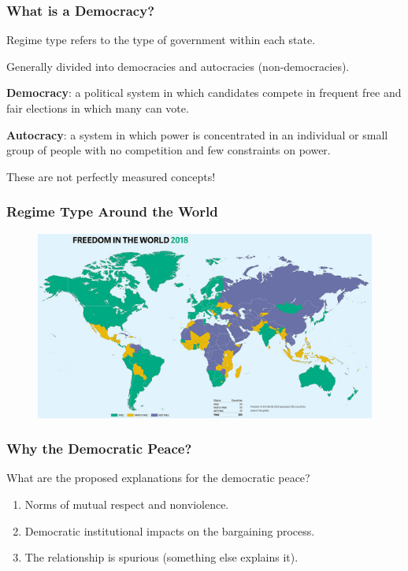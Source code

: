 \documentclass{beamer}
\begin{document}
\begin{frame} 
\frametitle{\LARGE{What is a Democracy?}}
\begin{itemize}
	\large{
		\item Regime type refers to the type of government within each state. \pause 
		\item Generally divided into democracies and autocracies (non-democracies). \pause 
		\item \textbf{Democracy}: a political system in which candidates compete in frequent free and fair elections in which many can vote. \pause 
		\item \textbf{Autocracy}: a system in which power is concentrated in an individual or small group of people with no competition and few constraints on power. \pause 
		\item These are not perfectly measured concepts!
	}
\end{itemize}
\end{frame}

\begin{frame} 
\frametitle{\LARGE{Regime Type Around the World}}
\begin{figure}[ht!]
	\centering
	\includegraphics[width=\textwidth,height=0.8\textheight,keepaspectratio]{./democ.jpg}
\end{figure}
\end{frame}

\begin{frame} 
\frametitle{\LARGE{Why the Democratic Peace?}}
What are the proposed explanations for the democratic peace? \pause
\begin{enumerate}
		\item Norms of mutual respect and nonviolence. \pause 
		\item Democratic institutional impacts on the bargaining process. \pause
		\item The relationship is spurious (something else explains it).
\end{enumerate}
\end{frame}
\end{document}
